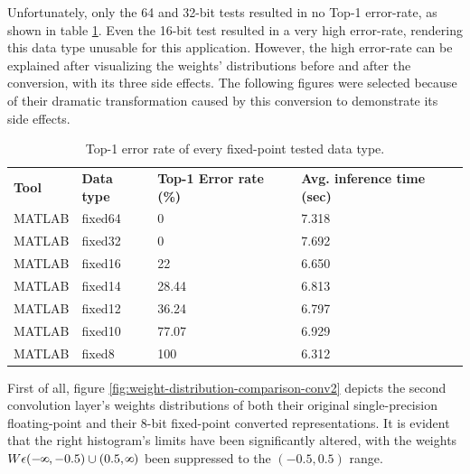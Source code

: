 Unfortunately, only the 64 and 32-bit tests resulted in no Top-1 error-rate, as shown in table \ref{tab:fixed-error-rates}. Even the 16-bit test resulted in a very high error-rate, rendering this data type unusable for this application. However, the high error-rate can be explained after visualizing the weights' distributions before and after the conversion, with its three side effects. The following figures were selected because of their dramatic transformation caused by this conversion to demonstrate its side effects.

\begin{table}[H]
	\caption{Top-1 error rate of every fixed-point tested data type.}
	\label{tab:fixed-error-rates}
	\centering
	\begin{tabular}{p{2cm} p{2cm} p{3cm} p{3cm}}
		\toprule
		\textbf{Tool} & \textbf{Data type} & \textbf{Top-1 Error rate (\%)} & \textbf{Avg. inference time (sec)} \\
			MATLAB 	& fixed64	& 0 		& 7.318 \\
			MATLAB 	& fixed32	& 0 		& 7.692 \\
			MATLAB 	& fixed16	& 22 		& 6.650 \\
			MATLAB 	& fixed14	& 28.44 	& 6.813 \\
			MATLAB 	& fixed12	& 36.24 	& 6.797 \\
			MATLAB 	& fixed10	& 77.07		& 6.929 \\
			MATLAB 	& fixed8	& 100 		& 6.312 \\
		\bottomrule
	\end{tabular}
\end{table}

First of all, figure \ref{fig:weight-distribution-comparison-conv2} depicts the second convolution layer's weights distributions of both their original single-precision floating-point and their 8-bit fixed-point converted representations. It is evident that the right histogram's limits have been significantly altered, with the weights $W \epsilon (-\infinity, -0.5) \cup (0.5, \infinity)$ been suppressed to the $(-0.5, 0.5)$ range.

